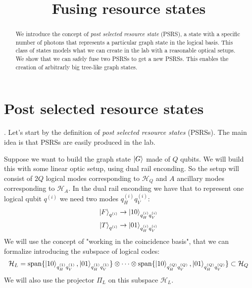 \documentclass{article}
\title{Fusing resource states}
\date{}
\DeclareMathOperator{\spn}{span}
\begin{document}
\maketitle
\begin{abstract}
    We introduce the concept of \textit{post selected resource state} (PSRS), a state with a specific number of photons that represents a particular graph state in the logical basis. This class of states models what we can create in the lab with a reasonable optical setups. We show that we can safely fuse two PSRSs to get a new PSRSs. This enables the creation of arbitrarly big tree-like graph states.
\end{abstract}

\tableofcontents

\newpage
\section{Post selected resource states}. 
Let's start by the definition of \textit{post selected resource states} (PSRSs). The main idea is that PSRSs are easily produced in the lab.

Suppose we want to build the graph state $\ket{G}$ made of $Q$ qubits. We will build this with some linear optic setup, using dual rail enconding. So the setup will consist of $2Q$ logical modes corresponding to $\mathcal{H}_Q$ and $A$ ancillary modes corresponding to $\mathcal{H}_A$. In the dual rail enconding we have that to represent one logical qubit $q^{(i)}$ we need two modes $q^{(i)}_Hq^{(i)}_V$:
\begin{align*}
   \ket{F}_{q^{(i)}} \rightarrow \ket{10}_{q^{(i)}_Hq^{(i)}_V} \\
   \ket{T}_{q^{(i)}} \rightarrow \ket{01}_{q^{(i)}_Hq^{(i)}_V}
\end{align*}
We will use the concept of "working in the coincidence basis", that we can formalize introducing the subspace of logical codes:
\begin{align*}
    \mathcal{H}_L = \spn\{\ket{10}_{q^{(1)}_Hq^{(1)}_V}, \ket{01}_{q^{(1)}_Hq^{(1)}_V} \} \otimes \dots \otimes \spn\{\ket{10}_{q^{(Q)}_Hq^{(Q)}_V}, \ket{01}_{q^{(Q)}_Hq^{(Q)}_V} \} \subset \mathcal{H}_Q
\end{align*}
We will also use the projector $\Pi_L$ on this subspace $\mathcal{H}_L$.
\end{document}
